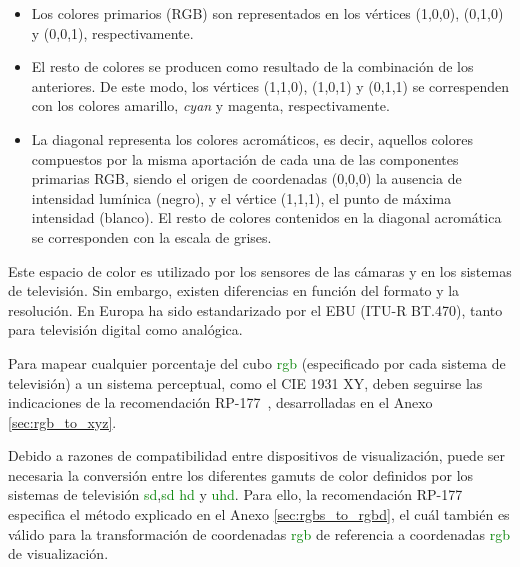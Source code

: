\documentclass[a4paper, 12pt]{report}
\begin{document}
\begin{itemize}
    \item Los colores primarios (RGB) son representados en los vértices (1,0,0), (0,1,0) y (0,0,1), respectivamente.
    \item El resto de colores se producen como resultado de la combinación de los anteriores. De este modo, los vértices (1,1,0), (1,0,1) y (0,1,1)
     se correspenden con los colores amarillo, \textit{cyan} y magenta, respectivamente.
     \item La diagonal representa los colores acromáticos, es decir, aquellos colores compuestos por la misma aportación de cada una de las componentes primarias RGB, siendo el origen de coordenadas (0,0,0) la ausencia de intensidad lumínica (negro), y el vértice (1,1,1), el punto de máxima intensidad (blanco). El resto de colores contenidos en la diagonal acromática se corresponden con la escala de grises.
\end{itemize}
 Este espacio de color es utilizado por los sensores de las cámaras y  en los sistemas de televisión. Sin embargo, existen diferencias en función del formato y la resolución. En Europa ha sido estandarizado por el EBU (ITU-R BT.470), tanto para televisión digital como analógica.


Para mapear cualquier porcentaje del cubo \textcolor{green}{rgb} (especificado por cada sistema de televisión) a un sistema perceptual, como el CIE 1931 XY, deben seguirse las indicaciones de la recomendación RP-177~\cite{smpte:_rp177}, desarrolladas en el Anexo \ref{sec:rgb_to_xyz}.
 

 

Debido a razones de compatibilidad entre dispositivos de visualización, puede ser necesaria la conversión entre los diferentes gamuts de color definidos por los sistemas de televisión \textcolor{green}{sd},\textcolor{green}{sd} \textcolor{green}{hd} y \textcolor{green}{uhd}. Para ello, la recomendación RP-177~\cite{smpte:_rp177} especifica el método explicado en el Anexo \ref{sec:rgbs_to_rgbd}, el cuál también es válido para la transformación de coordenadas \textcolor{green}{rgb} de referencia a coordenadas \textcolor{green}{rgb} de visualización.
\end{document}
